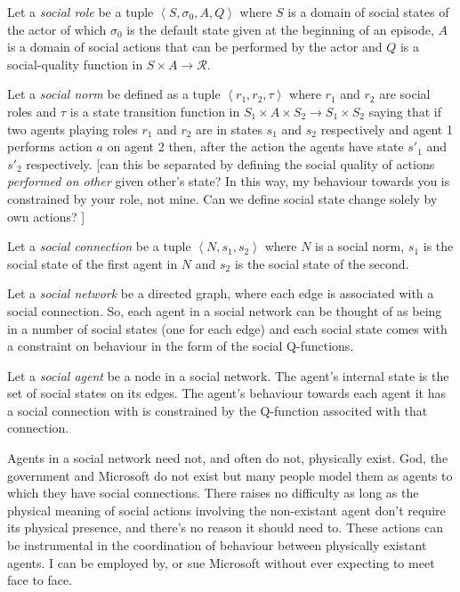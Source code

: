 \documentclass[a4paper]{article}
\begin{document}
Let a \textit{social role} be a tuple $\left<S, \sigma_0, A, Q\right>$ where $S$ is a domain of social states of the actor of which $\sigma_0$ is the default state given at the beginning of an episode, $A$ is a domain of social actions that can be performed by the actor and $Q$ is a social-quality function in $S \times A \to \mathcal{R}$. 

Let a \textit{social norm} be defined as a tuple $\left<r_1, r_2, \tau \right>$ where $r_1$ and $r_2$ are social roles and $\tau$ is a state transition function in $S_1 \times A \times S_2 \to S_1 \times S_2$ saying that if two agents playing roles $r_1$ and $r_2$ are in states $s_1$ and $s_2$ respectively and agent 1 performs action $a$ on agent 2 then, after the action the agents have state $s'_1$ and $s'_2$ respectively. [can this be separated by defining the social quality of actions \textit{performed on other} given other's state? In this way, my behaviour towards you is constrained by your role, not mine. Can we define social state change solely by own actions? ]

Let a \textit{social connection} be a tuple $\left<N, s_1, s_2 \right>$ where $N$ is a social norm, $s_1$ is the social state of the first agent in $N$ and $s_2$ is the social state of the second.

Let a \textit{social network} be a directed graph, where each edge is associated with a social connection. So, each agent in a social network can be thought of as being in a number of social states (one for each edge) and each social state comes with a constraint on behaviour in the form of the social Q-functions.

Let a \textit{social agent} be a node in a social network. The agent's internal state is the set of social states on its edges. The agent's behaviour towards each agent it has a social connection with is constrained by the Q-function associted with that connection.

Agents in a social network need not, and often do not, physically exist. God, the government and Microsoft do not exist but many people model them as agents to which they have social connections. There raises no difficulty as long as the physical meaning of social actions involving the non-existant agent don't require its physical presence, and there's no reason it should need to. These actions can be instrumental in the coordination of behaviour between physically existant agents. I can be employed by, or sue Microsoft without ever expecting to meet face to face.
\end{document}
